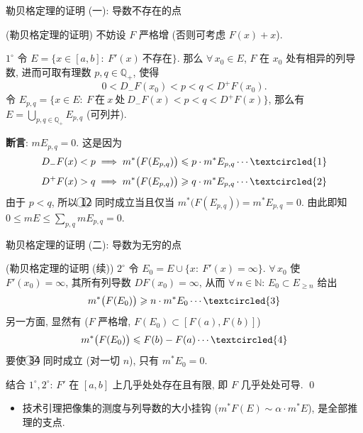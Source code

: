 \begin{frame}{勒贝格定理的证明 (一): 导数不存在的点}

\startproof[bg=yellow, fg=red](勒贝格定理的证明)
不妨设 $F$ 严格增 (否则可考虑 $F(x) + x$).

$1^{\circ}$ 令 $E = \{ x \in [a, b]:\ F'(x)\ \text{不存在} \}$.
那么 $\forall\, x_0 \in E$, $F$ 在 $x_0$ 处有相异的列导数, 进而可取有理数
$p, q \in \mathbb{Q}_+$, 使得
\[
0 < D_- F(x_0) < p < q < D^+ F(x_0) .
\]
令 $E_{p, q} = \{ x \in E:\ F\ \text{在}\ x\ \text{处}\ D_- F(x) < p < q < D^+ F(x) \}$,
那么有 $E = \bigcup_{p, q \in \mathbb{Q}_+} E_{p, q}$ (可列并).

\pause

\textbf{断言}: $m E_{p, q} = 0$.
这是因为
\[
D_- F(x) < p
\;\Longrightarrow\;
m^* \big( F(E_{p, q}) \big) \leqslant p \cdot m^* E_{p, q} \cdots \textcircled{1}
\]
\[
D^+ F(x) > q
\;\Longrightarrow\;
m^* \big( F(E_{p, q}) \big) \geqslant q \cdot m^* E_{p, q} \cdots \textcircled{2}
\]
由于 $p < q$, 所以 \textcircled{1}\textcircled{2} 同时成立当且仅当
$m^* \big( F(E_{p, q}) \big) = m^* E_{p, q} = 0$.
由此即知 $0 \leqslant m E \leqslant \sum_{p, q} m E_{p, q} = 0$.

\end{frame}


\begin{frame}{勒贝格定理的证明 (二): 导数为无穷的点}

\startproof[bg=yellow, fg=red](勒贝格定理的证明 (续))
$2^{\circ}$ 令 $E_0 = E \cup \{ x:\ F'(x) = \infty \}$.
$\forall\, x_0$ 使 $F'(x_0) = \infty$, 其所有列导数 $D F(x_0) = \infty$,
从而 $\forall\, n \in \mathbb{N}$: $E_0 \subset E_{\geqslant n}$ 给出
\[
m^* \big( F(E_0) \big) \geqslant n \cdot m^* E_0 \cdots \textcircled{3}
\]
另一方面, 显然有 ($F$ 严格增, $F(E_0) \subset [F(a), F(b)]$)
\[
m^* \big( F(E_0) \big) \leqslant F(b) - F(a) \cdots \textcircled{4}
\]
要使 \textcircled{3}\textcircled{4} 同时成立 (对一切 $n$), 只有 $m^* E_0 = 0$.

\pause

结合 $1^{\circ}, 2^{\circ}$: $F'$ 在 $[a, b]$ 上几乎处处存在且有限,
即 $F$ 几乎处处可导.
\qed

\pause

\begin{itemize}
\item 技术引理把\alert{像集的测度}与\alert{列导数的大小}挂钩
  ($m^* F(E) \sim \alpha \cdot m^* E$), 是全部推理的支点.
\end{itemize}

\end{frame}

